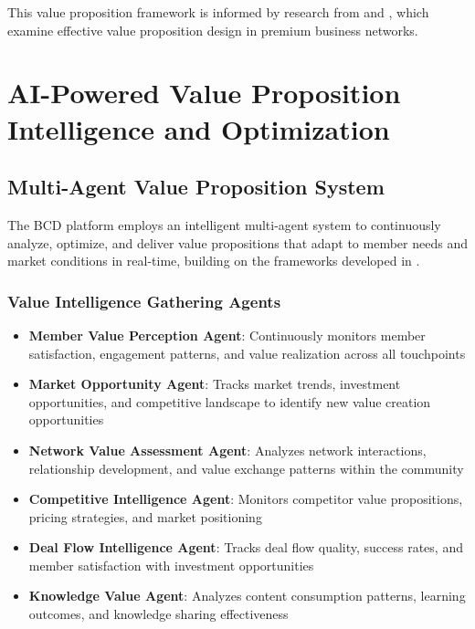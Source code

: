 This value proposition framework is informed by research from \citep{patricia_value_proposition_design} and \citep{unknown_importance_of_value}, which examine effective value proposition design in premium business networks.

\section{AI-Powered Value Proposition Intelligence and Optimization}

\subsection{Multi-Agent Value Proposition System}

The BCD platform employs an intelligent multi-agent system to continuously analyze, optimize, and deliver value propositions that adapt to member needs and market conditions in real-time, building on the frameworks developed in \citep{reiff_multiagent_sophisticated_system}.

\subsubsection{Value Intelligence Gathering Agents}

\begin{itemize}
    \item \textbf{Member Value Perception Agent}: Continuously monitors member satisfaction, engagement patterns, and value realization across all touchpoints
    \item \textbf{Market Opportunity Agent}: Tracks market trends, investment opportunities, and competitive landscape to identify new value creation opportunities
    \item \textbf{Network Value Assessment Agent}: Analyzes network interactions, relationship development, and value exchange patterns within the community
    \item \textbf{Competitive Intelligence Agent}: Monitors competitor value propositions, pricing strategies, and market positioning
    \item \textbf{Deal Flow Intelligence Agent}: Tracks deal flow quality, success rates, and member satisfaction with investment opportunities
    \item \textbf{Knowledge Value Agent}: Analyzes content consumption patterns, learning outcomes, and knowledge sharing effectiveness
\end{itemize}

